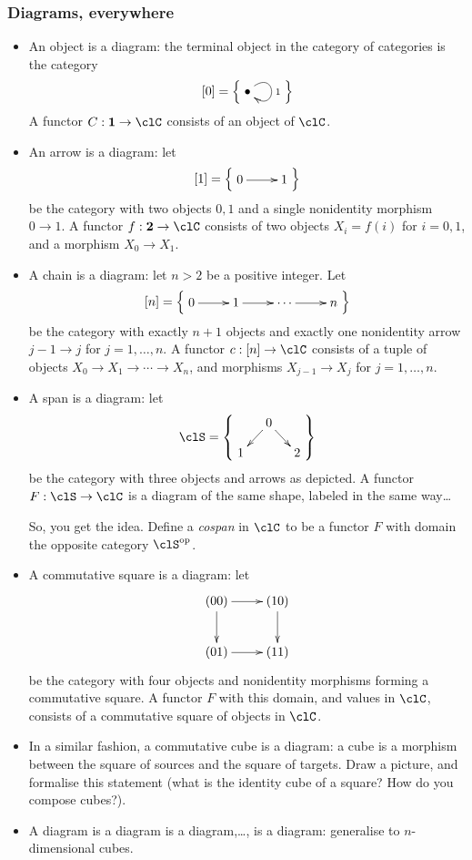 \documentclass[11pt]{article}
\begin{document}
\subsubsection{Diagrams, everywhere}
\begin{itemize}
\item An object is a diagram: the terminal object in the category of categories is the category 
\[[0] = \Big\{ 
\vcenter{\xymatrix{
	\bullet \ar@(ur,dr)^1
}}\Big\}\]
A functor $C : \textbf{1} \to \clC$ consists of an object of $\clC$.
\item An arrow is a diagram: let 
\[[1] = \Big\{ \vcenter{\xymatrix{0 \ar[r] & 1}} \Big\}\]
be the category with two objects $0,1$ and a single nonidentity morphism $0\to 1$. A functor $f : \textbf{2} \to \clC$ consists of two objects $X_i = f(i)$ for $i=0,1$, and a morphism $X_0\to X_1$.
\item A chain is a diagram: let $n>2$ be a positive integer. Let 
\[[n] = \Big\{ \vcenter{\xymatrix{0 \ar[r] & 1 \ar[r] & \cdots \ar[r] & n}} \Big\}\] be the category with exactly $n+1$ objects and exactly one nonidentity arrow $j-1\to j$ for $j=1,\dots,n$. A functor $c : [n] \to \clC$ consists of a tuple of objects $X_0 \to X_1 \to \cdots \to X_n$, and morphisms $X_{j-1}\to X_j$ for $j=1,\dots,n$. 
\item A span is a diagram: let 
\[
\clS = \left\{ \vcenter{\xymatrix@R=4mm@C=4mm{
	&0\ar[dr]\ar[dl]& \\
	1 && 2
}}	\right\}
\] be the category with three objects and arrows as depicted. A functor $F : \clS \to \clC$ is a diagram of the same shape, labeled in the same way\dots

So, you get the idea. Define a \emph{cospan} in $\clC$ to be a functor $F$ with domain the opposite category $\clS^\opp$.
\item A commutative square is a diagram: let 
\[\vcenter{
	\xymatrix{
		(00) \ar[d]\ar[r] & (10) \ar[d]\\
		(01) \ar[r] & (11)
	}
}\]
be the category with four objects and nonidentity morphisms forming a commutative square. A functor $F$ with this domain, and values in $\clC$, consists of a commutative square of objects in $\clC$.
\item In a similar fashion, a commutative cube is a diagram: a cube is a morphism between the square of sources and the square of targets. Draw a picture, and formalise this statement (what is the identity cube of a square? How do you compose cubes?). 
\item A diagram is a diagram is a diagram,\dots, is a diagram: generalise to $n$-dimensional cubes.
\end{itemize}
\end{document}
